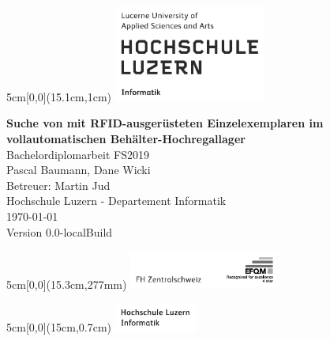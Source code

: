 \providecommand{\docversion}{0.0-localBuild}
\begin{titlepage}
	\begin{textblock*}{5cm}[0,0](15.1cm,1cm)
		\includegraphics[keepaspectratio,width=5cm]{img/HSLU_Logo}
	\end{textblock*}
	\begin{center}
		\vspace*{5cm}
		\Huge{\textbf{Suche von mit RFID-ausgerüsteten Einzelexemplaren im vollautomatischen Behälter-Hochregallager}} \\
		\vspace{0.5em}
		\Large{Bachelordiplomarbeit FS2019}\\
		\vspace{3em}
		\LARGE{Pascal Baumann, Dane Wicki}\\
		\vspace{1em}
		\Large{Betreuer: Martin Jud}\\
		\vfill
		\large{Hochschule Luzern - Departement Informatik}\\
		\large{\today}\\
		\large{Version \docversion}
	\end{center}
	\begin{textblock*}{5cm}[0,0](15.3cm,277mm)
		\includegraphics[keepaspectratio,width=5cm]{img/FHZ_Logo}
	\end{textblock*}
\end{titlepage}

\newpage


\begin{textblock*}{5cm}[0,0](15cm,0.7cm)
	\includegraphics[keepaspectratio,width=2.7cm]{img/HSLU_Logo_Header}
\end{textblock*}

